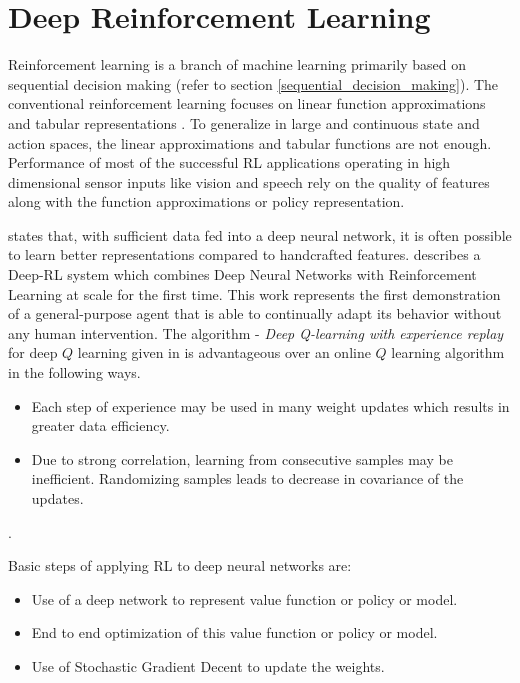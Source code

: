 \documentclass[12pt]{report}
\begin{document}
\section{Deep Reinforcement Learning}
\label{deep_rl_section}
Reinforcement learning is a branch of machine learning primarily based on sequential decision making (refer to section \ref{sequential_decision_making}). The conventional reinforcement learning focuses on linear function approximations and tabular representations \cite{gamedeep}. To generalize in large and continuous state and action spaces, the linear approximations and tabular functions are not enough\cite{morton2016deep}. Performance of most of the successful RL applications operating in high dimensional sensor inputs like vision and speech rely on the quality of features along with the function approximations or policy representation.\par 
\cite{krizhevsky2012imagenet} states that, with sufficient data fed into a deep neural network, it is often possible to learn better representations compared to handcrafted features. \cite{mnih2015human} describes a Deep-RL system which combines Deep Neural Networks with Reinforcement Learning at scale for the first time. This work represents the first demonstration of a general-purpose agent that is able to continually adapt its behavior without any human intervention. 
The algorithm - \textit{Deep Q-learning with experience replay} for deep $Q$ learning given in \cite{mnih2013playing} is advantageous over an online $Q$ learning algorithm in the following ways.
\begin{itemize}
\item Each step of experience may be used in many weight updates which results in greater data efficiency.
\item Due to strong correlation, learning from consecutive samples may be inefficient. Randomizing samples leads to decrease in covariance of the updates.
\end{itemize}.\par 
Basic steps of applying RL to deep neural networks are:
\begin{itemize}
\item Use of a deep network to represent value function or policy or model.
\item End to end optimization of this value function or policy or model.
\item Use of Stochastic Gradient Decent to update the weights.
\end{itemize}
\cite{mnih2013playing}
\end{document}
